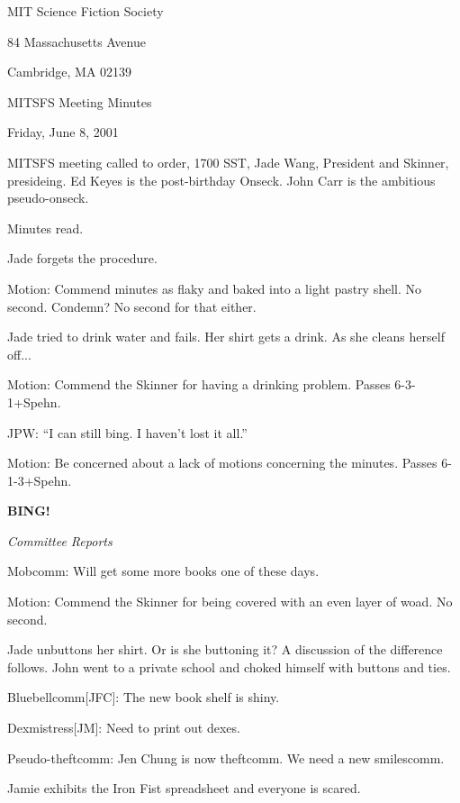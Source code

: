 \documentclass[12pt]{article}
\newcommand{\bing}{{\bf BING!} }
\newcommand{\goto}[1]{\bing \vskip 12pt \centerline{{\em{#1}}}}
\begin{document}
\begin{center}

MIT Science Fiction Society 

84 Massachusetts Avenue

Cambridge, MA 02139

\vspace{12pt}

MITSFS Meeting Minutes 

Friday, June 8, 2001

\end{center}
 
\vspace{18pt}

\setlength{\parskip}{6pt}

\noindent
MITSFS meeting called to order, 1700 SST, Jade Wang, President and Skinner,
presideing.  Ed Keyes is the post-birthday Onseck.  John Carr is the
ambitious pseudo-onseck.

Minutes read.

Jade forgets the procedure.

Motion: Commend minutes as flaky and baked into a light pastry shell.
No second.
Condemn?  No second for that either.

Jade tried to drink water and fails.  Her shirt gets a drink.
As she cleans herself off...

Motion: Commend the Skinner for having a drinking problem.  Passes \hbox{6-3-1+Spehn}.

JPW: ``I can still bing.  I haven't lost it all.''

Motion: Be concerned about a lack of motions concerning the minutes.
Passes \hbox{6-1-3+Spehn}.

\goto{Committee Reports}

Mobcomm: Will get some more books one of these days.

Motion: Commend the Skinner for being covered with an even layer of woad.
No second.

Jade unbuttons her shirt.  Or is she buttoning it?  A discussion of the
difference follows.  John went to a private school and choked himself with
buttons and ties.

Bluebellcomm[JFC]: The new book shelf is shiny.

Dexmistress[JM]: Need to print out dexes.

Pseudo-theftcomm: Jen Chung is now theftcomm.  We need a new smilescomm.

Jamie exhibits the Iron Fist spreadsheet and everyone is scared.
\end{document}
